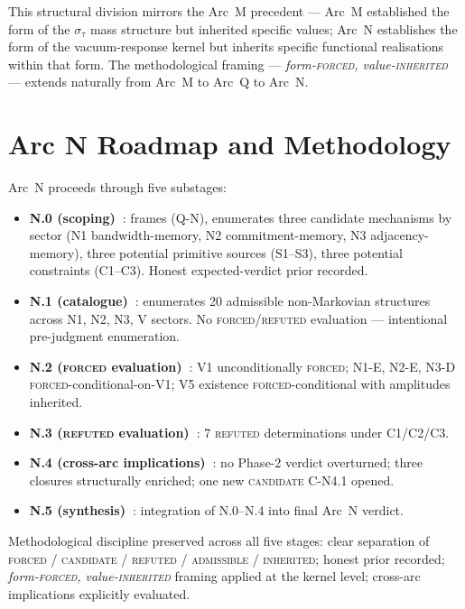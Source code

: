 \documentclass[11pt,a4paper]{article}
\begin{document}
This structural division mirrors the Arc~M precedent --- Arc~M established the form of the $\sigma_\tau$ mass structure but inherited specific values; Arc~N establishes the form of the vacuum-response kernel but inherits specific functional realisations within that form. The methodological framing --- \emph{form-\textsc{forced}, value-\textsc{inherited}} --- extends naturally from Arc~M to Arc~Q to Arc~N.

\section{Arc N Roadmap and Methodology}

Arc~N proceeds through five substages:

\begin{itemize}
  \item \textbf{N.0 (scoping)~\cite{n0}}: frames (Q-N), enumerates three candidate mechanisms by sector (N1 bandwidth-memory, N2 commitment-memory, N3 adjacency-memory), three potential primitive sources (S1--S3), three potential constraints (C1--C3). Honest expected-verdict prior recorded.
  \item \textbf{N.1 (catalogue)~\cite{n1}}: enumerates 20 admissible non-Markovian structures across N1, N2, N3, V sectors. No \textsc{forced}/\textsc{refuted} evaluation --- intentional pre-judgment enumeration.
  \item \textbf{N.2 (\textsc{forced} evaluation)~\cite{n2}}: V1 unconditionally \textsc{forced}; N1-E, N2-E, N3-D \textsc{forced}-conditional-on-V1; V5 existence \textsc{forced}-conditional with amplitudes inherited.
  \item \textbf{N.3 (\textsc{refuted} evaluation)~\cite{n3}}: 7 \textsc{refuted} determinations under C1/C2/C3.
  \item \textbf{N.4 (cross-arc implications)~\cite{n4}}: no Phase-2 verdict overturned; three closures structurally enriched; one new \textsc{candidate} C-N4.1 opened.
  \item \textbf{N.5 (synthesis)~\cite{n5}}: integration of N.0--N.4 into final Arc~N verdict.
\end{itemize}

Methodological discipline preserved across all five stages: clear separation of \textsc{forced} / \textsc{candidate} / \textsc{refuted} / \textsc{admissible} / \textsc{inherited}; honest prior recorded; \emph{form-\textsc{forced}, value-\textsc{inherited}} framing applied at the kernel level; cross-arc implications explicitly evaluated.
\end{document}

